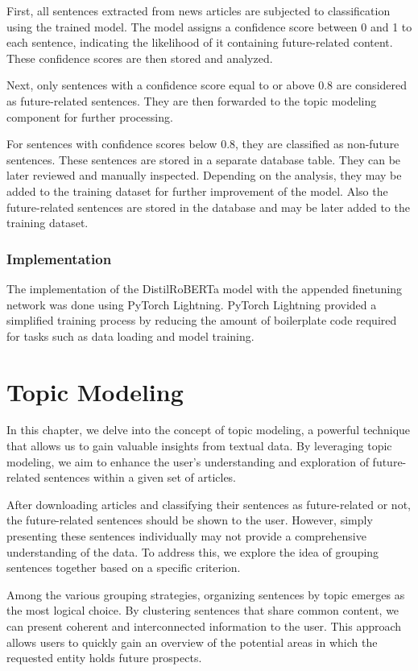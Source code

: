 \documentclass[a4paper,12pt]{report} %
\begin{document}
First, all sentences extracted from news articles are subjected to classification using the trained model. The model assigns a confidence score between 0 and 1 to each sentence, indicating the likelihood of it containing future-related content. These confidence scores are then stored and analyzed.

Next, only sentences with a confidence score equal to or above 0.8 are considered as future-related sentences. They are then forwarded to the topic modeling component for further processing.

For sentences with confidence scores below 0.8, they are classified as non-future sentences. These sentences are stored in a separate database table. They can be later reviewed and manually inspected. Depending on the analysis, they may be added to the training dataset for further improvement of the model.
Also the future-related sentences are stored in the database and may be later added to the training dataset.

\subsection{Implementation}
The implementation of the DistilRoBERTa model with the appended finetuning network was done using PyTorch Lightning. PyTorch Lightning provided a simplified training process by reducing the amount of boilerplate code required for tasks such as data loading and model training.

\chapter{Topic Modeling}
In this chapter, we delve into the concept of topic modeling, a powerful technique that allows us to gain valuable insights from textual data. By leveraging topic modeling, we aim to enhance the user's understanding and exploration of future-related sentences within a given set of articles.

After downloading articles and classifying their sentences as future-related or not, the future-related sentences should be shown to the user. However, simply presenting these sentences individually may not provide a comprehensive understanding of the data. To address this, we explore the idea of grouping sentences together based on a specific criterion.

Among the various grouping strategies, organizing sentences by topic emerges as the most logical choice. By clustering sentences that share common content, we can present coherent and interconnected information to the user. This approach allows users to quickly gain an overview of the potential areas in which the requested entity holds future prospects.
\end{document}
